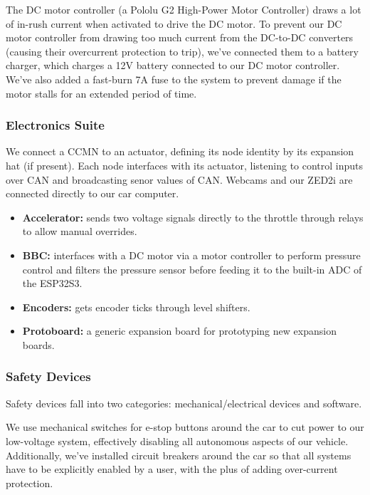 The DC motor controller (a Pololu G2 High-Power Motor Controller) draws
a lot of in-rush current when activated to drive the DC motor. To
prevent our DC motor controller from drawing too much current from the
DC-to-DC converters (causing their overcurrent protection to trip),
we've connected them to a battery charger, which charges a 12V battery
connected to our DC motor controller. We've also added a fast-burn 7A
fuse to the system to prevent damage if the motor stalls for an
extended period of time.

\subsubsection{Electronics Suite}

We connect a CCMN to an actuator, defining its node identity by its
expansion hat (if present). Each node interfaces with its actuator,
listening to control inputs over CAN and broadcasting senor values of
CAN. Webcams and our ZED2i are connected directly to our car computer.

\begin{itemize}
  \item \textbf{Accelerator:} sends two voltage signals directly to the throttle through relays to allow manual overrides.
  \item \textbf{BBC:} interfaces with a DC motor via a motor controller to perform pressure control and filters the pressure sensor before feeding it to the built-in ADC of the ESP32S3.
  \item \textbf{Encoders:} gets encoder ticks through level shifters.
  \item \textbf{Protoboard:} a generic expansion board for prototyping new expansion boards.
\end{itemize}

\subsubsection{Safety Devices}

Safety devices fall into two categories: mechanical/electrical devices
and software.

We use mechanical switches for e-stop buttons around the car to cut
power to our low-voltage system, effectively disabling all autonomous
aspects of our vehicle. Additionally, we've installed circuit breakers
around the car so that all systems have to be explicitly enabled by a
user, with the plus of adding over-current protection.


